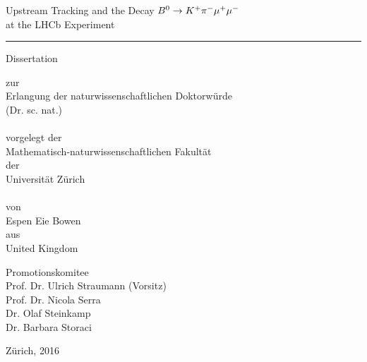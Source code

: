 \begin{titlepage}
 
\vspace*{-1.5cm}

\begin{center}
{\Large
Upstream Tracking and the Decay ${B}^{0} \rightarrow K^{+}\pi^{-}\mu^{+}\mu^{-}$\\ at the LHCb Experiment

\rule{\linewidth}{0.5pt}
}

\vspace*{1cm}

{\large
Dissertation \\
}

zur \\
Erlangung der naturwissenschaftlichen Doktorw\"urde \\ (Dr. sc. nat.) \\~\\
vorgelegt der \\ Mathematisch-naturwissenschaftlichen Fakult\"at \\
der \\
Universit\"at Z\"urich \\~\\
von \\
Espen Eie Bowen \\
aus \\
United Kingdom \\

\vspace*{1cm}

Promotionskomitee \\
Prof. Dr. Ulrich Straumann (Vorsitz) \\
Prof. Dr. Nicola Serra \\
Dr. Olaf Steinkamp \\
Dr. Barbara Storaci \\

\vspace*{1cm}

Z\"urich, 2016

\end{center}
\end{titlepage}